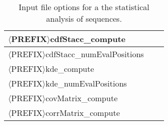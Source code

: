 \begin{table}[!h]
\begin{center}
\begin{tabular}{|l|c|c|}
\hline
\hline
$\langle$PREFIX$\rangle$cdfStacc\_compute          &         &             \\
\hline
$\langle$PREFIX$\rangle$cdfStacc\_numEvalPositions &         &             \\
\hline
\hline
$\langle$PREFIX$\rangle$kde\_compute               &         &             \\
\hline
$\langle$PREFIX$\rangle$kde\_numEvalPositions      &         &             \\
\hline
\hline
$\langle$PREFIX$\rangle$covMatrix\_compute         &         &             \\
\hline
$\langle$PREFIX$\rangle$corrMatrix\_compute        &         &             \\
\hline
\end{tabular}
\end{center}
\caption{
Input file options for a the statistical analysis of sequences.
}
\label{tab-seq-statistical-options}
\end{table}

